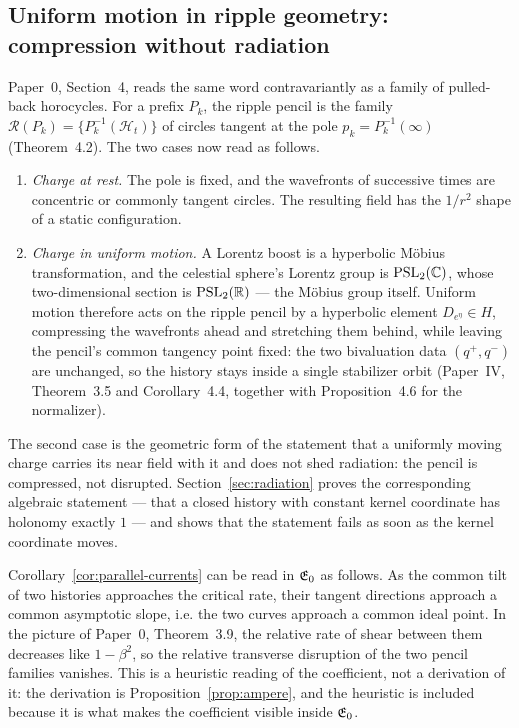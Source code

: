 \subsection{Uniform motion in ripple geometry: compression without radiation}

Paper~0, Section~4, reads the same word contravariantly as a family of pulled-back
horocycles.  For a prefix $P_k$, the ripple pencil is the family
$\mathcal R(P_k)=\{P_k^{-1}(\mathcal H_t)\}$ of circles tangent at the pole
$p_k=P_k^{-1}(\infty)$ (Theorem~4.2).  The two cases now read as follows.

\begin{enumerate}[label=(\roman*)]
  \item \emph{Charge at rest.}  The pole is fixed, and the wavefronts of
  successive times are concentric or commonly tangent circles.  The resulting
  field has the $1/r^{2}$ shape of a static configuration.
  \item \emph{Charge in uniform motion.}  A Lorentz boost is a hyperbolic
  M\"obius transformation, and the celestial sphere's Lorentz group is
  $\operatorname{PSL}_2(\mathbb{C})$, whose two-dimensional section is $\operatorname{PSL}_2(\mathbb{R})$ --- the \AEG{}
  M\"obius group itself.  Uniform motion therefore acts on the ripple pencil by
  a hyperbolic element $D_{e^{\eta}}\in H$, compressing the wavefronts ahead and
  stretching them behind, while leaving the pencil's common tangency point fixed:
  the two bivaluation data $(q^+,q^-)$ are unchanged, so the history stays inside
  a single stabilizer orbit (Paper~IV, Theorem~3.5 and
  Corollary~4.4, together with Proposition~4.6 for the normalizer).
\end{enumerate}

The second case is the geometric form of the statement that a uniformly moving
charge carries its near field with it and does not shed radiation: the pencil is
compressed, not disrupted.  Section~\ref{sec:radiation} proves the corresponding
algebraic statement --- that a closed history with constant kernel coordinate has
holonomy exactly $1$ --- and shows that the statement fails as soon as the kernel
coordinate moves.

\begin{remark}
\label{rem:v-to-c}
Corollary~\ref{cor:parallel-currents} can be read in $\mathfrak{E}_0$ as follows.  As the
common tilt of two histories approaches the critical rate, their tangent
directions approach a common asymptotic slope, i.e. the two curves approach a
common ideal point.  In the picture of Paper~0, Theorem~3.9, the relative rate of
shear between them decreases like $1-\beta^{2}$, so the relative transverse
disruption of the two pencil families vanishes.  This is a heuristic reading of
the coefficient, not a derivation of it: the derivation is
Proposition~\ref{prop:ampere}, and the heuristic is included because it is what
makes the coefficient visible inside $\mathfrak{E}_0$.
\end{remark}
